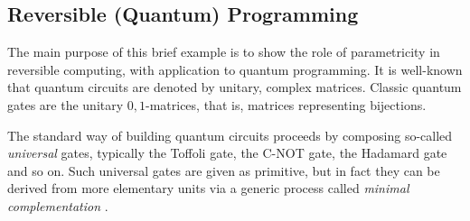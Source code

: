 \documentclass[sigplan,screen]{acmart}
\def\comp{ \mathbin{\cdot} }
\begin{document}

\subsection{Reversible (Quantum) Programming}
The main purpose of this brief example is to show the role of parametricity in reversible computing, with application to quantum programming. It is well-known that quantum circuits are denoted by unitary, complex matrices. Classic quantum gates are the unitary \ensuremath{\mathrm{0},\mathrm{1}}-matrices, that is, matrices representing bijections.

The standard way of building quantum circuits proceeds by composing so-called \emph{universal} gates, typically the Toffoli gate, the C-NOT gate, the Hadamard gate and so on. Such universal gates are given as primitive, but in fact they can be derived from more elementary units via a generic process called \emph{minimal complementation} \cite{Ol18}.
\end{document}
